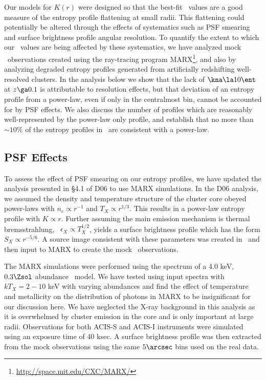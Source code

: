 \documentclass[apj]{emulateapj}
\begin{document}
Our models for $K(r)$ were designed so that the best-fit \kna\ values
are a good measure of the entropy profile flattening at small
radii. This flattening could potentially be altered through the
effects of systematics such as PSF smearing and surface brightness
profile angular resolution. To quantify the extent to which our
\kna\ values are being affected by these systematics, we have analyzed
mock \chandra\ observations created using the ray-tracing program
MARX\footnote{\url{http://space.mit.edu/CXC/MARX/}}, and also by
analyzing degraded entropy profiles generated from artificially
redshifting well-resolved clusters. In the analysis below we show that
the lack of $\kna \la 10 \ent$ at $z \ga 0.1$ is attributable to
resolution effects, but that deviation of an entropy profile from a
power-law, even if only in the centralmost bin, cannot be accounted
for by PSF effects. We also discuss the number of profiles which are
reasonably well-represented by the power-law only profile, and
establish that no more than $\sim 10\%$ of the entropy profiles in
\accept\ are consistent with a power-law.

\subsection{PSF Effects}
\label{sec:psf}

To assess the effect of PSF smearing on our entropy profiles, we have
updated the analysis presented in \S4.1 of D06 to use MARX
simulations. In the D06 analysis, we assumed the density and
temperature structure of the cluster core obeyed power-laws with $n_e
\propto r^{-1}$ and $T_X \propto r^{1/3}$. This results in a power-law
entropy profile with $K \propto r$. Further assuming the main emission
mechanism is thermal bremsstrahlung, \ie\ $\epsilon_X \propto
T_X^{1/2}$, yields a surface brightness profile which has the form
$S_X \propto r^{-5/6}$. A source image consistent with these
parameters was created in \idl\ and then input to MARX to create the
mock \chandra\ observations.

The MARX simulations were performed using the spectrum of a 4.0 keV,
$0.3 \Zsol$ abundance \mekal\ model. We have tested using input
spectra with $kT_X = 2-10$ keV with varying abundances and find the
effect of temperature and metallicity on the distribution of photons
in MARX to be insignificant for our discussion here. We have neglected
the X-ray background in this analysis as it is overwhelmed by cluster
emission in the core and is only important at large
radii. Observations for both ACIS-S and ACIS-I instruments were
simulated using an exposure time of 40 ksec. A surface brightness
profile was then extracted from the mock observations using the same
$5\arcsec$ bins used on the real data.
\end{document}
